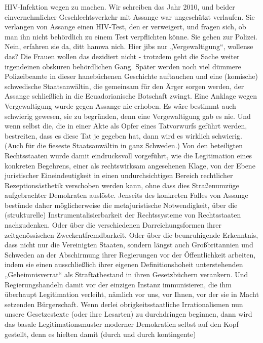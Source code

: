 \begin{multicols}{2}
{{HIV-Infektion wegen zu machen. Wir schreiben das Jahr
2010, und beider einvernehmlicher Geschlechtsverkehr
mit Assange war ungeschützt verlaufen. Sie verlangen
von Assange einen HIV-Test, den er verweigert, und fragen
sich, ob man ihn nicht behördlich zu einem Test verpflichten könne. Sie gehen zur Polizei. Nein, erfahren sie da, ditt
hamwa nich. Hier jibs nur „Vergewaltigung“, wollense
das? Die Frauen wollen das dezidiert nicht - trotzdem
geht die Sache weiter irgendeinen obskuren behördlichen
Gang. Später werden noch viel dümmere Polizeibeamte
in dieser hanebüchenen Geschichte auftauchen und eine
(komische) schwedische Staatsanwältin, die gemeinsam
für den Ärger sorgen werden, der Assange schließlich in
die Ecuadorianische Botschaft zwingt. Eine Anklage wegen Vergewaltigung wurde gegen Assange nie erhoben. Es
wäre bestimmt auch schwierig gewesen, sie zu begründen,
denn eine Vergewaltigung gab es nie. Und wenn selbst die,
die in einer Akte als Opfer eines Tatvorwurfs geführt werden, bestreiten, dass es diese Tat je gegeben hat, dann wird
es wirklich schwierig. (Auch für die fieseste Staatsanwältin in ganz Schweden.)}\textCR
Von den beteiligten Rechtsstaaten wurde damit eindrucksvoll vorgeführt, wie die Legitimation eines konkreten Begehrens, einer als rechtswirksam angesehenen
Klage, von der Ebene juristischer Eineindeutigkeit in
einen undurchsichtigen Bereich rechtlicher Rezeptionsästhetik verschoben werden kann, ohne dass dies Straßenumzüge aufgebrachter Demokraten auslöste.\textCR
Jenseits des konkreten Falles von Assange bestünde
daher möglicherweise die metajuristische Notwendigkeit, über die (strukturelle) Instrumentalisierbarkeit der
Rechtssysteme von Rechtsstaaten nachzudenken. Oder
über die verschiedenen Darreichungsformen ihrer zeitgenössischen Zweckentfremdbarkeit.\textCR
Oder über die beunruhigende Erkenntnis, dass nicht
nur die Vereinigten Staaten, sondern längst auch Großbritannien und Schweden an der Abschirmung ihrer
Regierungen vor der Öffentlichkeit arbeiten, indem sie
einen ausschließlich ihrer eigenen Definitionshoheit
unterstehenden „Geheimnisverrat“ als Straftatbestand
in ihren Gesetzbüchern verankern. Und Regierungshandeln damit vor der einzigen Instanz immunisieren, die
ihm überhaupt Legitimation verleiht, nämlich vor uns,
vor Ihnen, vor der sie in Macht setzenden Bürgerschaft.\textCR
Wenn derlei obrigkeitsstaatliche Irrationalismen nun
unsere Gesetzestexte (oder ihre Lesarten) zu durchdringen beginnen, dann wird das basale Legitimationsmuster moderner Demokratien selbst auf den Kopf gestellt,
denn es hielten damit (durch und durch kontingente)
}
\end{multicols}
